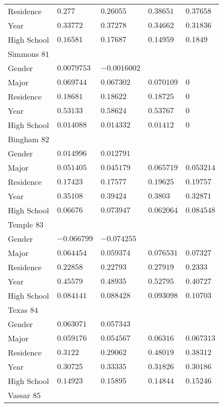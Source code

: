 \begin{center}
\begin{longtable}{|l|l|l|l|l|}
Residence & $0.277$ & $0.26055$ & $0.38651$ & $0.37658$ \\
Year & $0.33772$ & $0.37278$ & $0.34662$ & $0.31836$ \\
High School & $0.16581$ & $0.17687$ & $0.14959$ & $0.1849$ \\ \hline \hline
Simmons $81$ & & &   \\ \hline
Gender & $0.0079753$ & $-0.0016002$ & & \\
Major & $0.069744$ & $0.067302$ & $0.070109$ & $0$ \\
Residence & $0.18681$ & $0.18622$ & $0.18725$ & $0$ \\
Year & $0.53133$ & $0.58624$ & $0.53767$ & $0$ \\
High School & $0.014088$ & $0.014332$ & $0.01412$ & $0$ \\ \hline \hline
Bingham $82$ & & &   \\ \hline
Gender & $0.014996$ & $0.012791$ & & \\
Major & $0.051405$ & $0.045179$ & $0.065719$ & $0.053214$ \\
Residence & $0.17423$ & $0.17577$ & $0.19625$ & $0.19757$ \\
Year & $0.35108$ & $0.39424$ & $0.3803$ & $0.32871$ \\
High School & $0.06676$ & $0.073947$ & $0.062064$ & $0.084548$ \\ \hline \hline
Temple $83$ & & &   \\ \hline
Gender & $-0.066799$ & $-0.074255$ & & \\
Major & $0.064454$ & $0.059374$ & $0.076531$ & $0.07327$ \\
Residence & $0.22858$ & $0.22793$ & $0.27919$ & $0.2333$ \\
Year & $0.45579$ & $0.48935$ & $0.52795$ & $0.40727$ \\
High School & $0.084141$ & $0.088428$ & $0.093098$ & $0.10703$ \\ \hline \hline
Texas $84$ & & &   \\ \hline
Gender & $0.063071$ & $0.057343$ & & \\
Major & $0.059176$ & $0.054567$ & $0.06316$ & $0.067313$ \\
Residence & $0.3122$ & $0.29062$ & $0.48019$ & $0.38312$ \\
Year & $0.30725$ & $0.33335$ & $0.31826$ & $0.30186$ \\
High School & $0.14923$ & $0.15895$ & $0.14844$ & $0.15246$ \\ \hline \hline
Vassar $85$ & & &   \\ \hline

\end{longtable}
\end{center}

